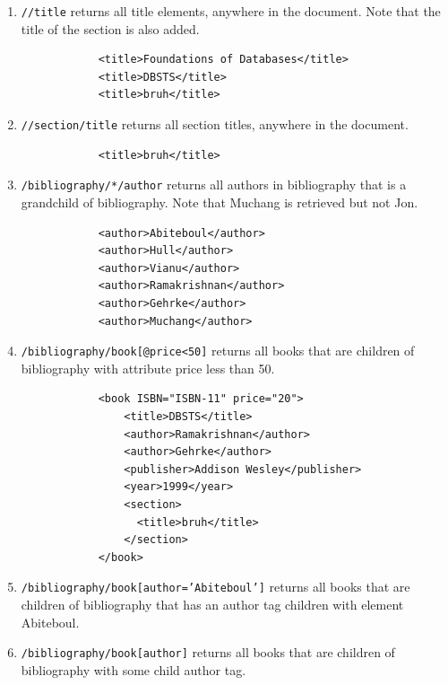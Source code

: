 \documentclass{article}
\begin{document}
\begin{example}
\begin{enumerate}
        \item \texttt{//title} returns all title elements, anywhere in the document. Note that the title of the section is also added. 
          \begin{lstlisting}
            <title>Foundations of Databases</title>
            <title>DBSTS</title>
            <title>bruh</title>
          \end{lstlisting}

        \item \texttt{//section/title} returns all section titles, anywhere in the document.
          \begin{lstlisting}
            <title>bruh</title>
          \end{lstlisting}

        \item \texttt{/bibliography/*/author} returns all authors in bibliography that is a grandchild of bibliography. Note that Muchang is retrieved but not Jon. 
          \begin{lstlisting}
            <author>Abiteboul</author>
            <author>Hull</author>
            <author>Vianu</author>
            <author>Ramakrishnan</author>
            <author>Gehrke</author>
            <author>Muchang</author>
          \end{lstlisting}

        \item \texttt{/bibliography/book[@price<50]} returns all books that are children of bibliography with attribute price less than 50. 
          \begin{lstlisting}
            <book ISBN="ISBN-11" price="20">
                <title>DBSTS</title>
                <author>Ramakrishnan</author>
                <author>Gehrke</author>
                <publisher>Addison Wesley</publisher>
                <year>1999</year>
                <section>
                  <title>bruh</title>
                </section>
            </book>
          \end{lstlisting}

        \item \texttt{/bibliography/book[author='Abiteboul']} returns all books that are children of bibliography that has an author tag children with element Abiteboul. 

        \item \texttt{/bibliography/book[author]} returns all books that are children of bibliography with some child author tag. 


\end{enumerate}
\end{example}
\end{document}
